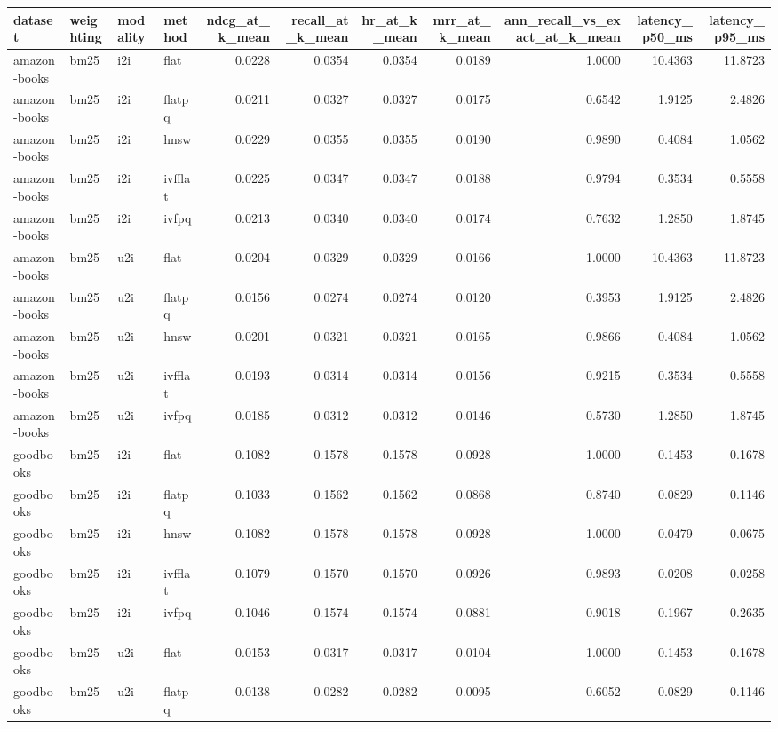 \begin{tabular}{llllrrrrrrr}
\toprule
dataset & weighting & modality & method & ndcg_at_k_mean & recall_at_k_mean & hr_at_k_mean & mrr_at_k_mean & ann_recall_vs_exact_at_k_mean & latency_p50_ms & latency_p95_ms \\
\midrule
amazon-books & bm25 & i2i & flat & 0.0228 & 0.0354 & 0.0354 & 0.0189 & 1.0000 & 10.4363 & 11.8723 \\
amazon-books & bm25 & i2i & flatpq & 0.0211 & 0.0327 & 0.0327 & 0.0175 & 0.6542 & 1.9125 & 2.4826 \\
amazon-books & bm25 & i2i & hnsw & 0.0229 & 0.0355 & 0.0355 & 0.0190 & 0.9890 & 0.4084 & 1.0562 \\
amazon-books & bm25 & i2i & ivfflat & 0.0225 & 0.0347 & 0.0347 & 0.0188 & 0.9794 & 0.3534 & 0.5558 \\
amazon-books & bm25 & i2i & ivfpq & 0.0213 & 0.0340 & 0.0340 & 0.0174 & 0.7632 & 1.2850 & 1.8745 \\
amazon-books & bm25 & u2i & flat & 0.0204 & 0.0329 & 0.0329 & 0.0166 & 1.0000 & 10.4363 & 11.8723 \\
amazon-books & bm25 & u2i & flatpq & 0.0156 & 0.0274 & 0.0274 & 0.0120 & 0.3953 & 1.9125 & 2.4826 \\
amazon-books & bm25 & u2i & hnsw & 0.0201 & 0.0321 & 0.0321 & 0.0165 & 0.9866 & 0.4084 & 1.0562 \\
amazon-books & bm25 & u2i & ivfflat & 0.0193 & 0.0314 & 0.0314 & 0.0156 & 0.9215 & 0.3534 & 0.5558 \\
amazon-books & bm25 & u2i & ivfpq & 0.0185 & 0.0312 & 0.0312 & 0.0146 & 0.5730 & 1.2850 & 1.8745 \\
goodbooks & bm25 & i2i & flat & 0.1082 & 0.1578 & 0.1578 & 0.0928 & 1.0000 & 0.1453 & 0.1678 \\
goodbooks & bm25 & i2i & flatpq & 0.1033 & 0.1562 & 0.1562 & 0.0868 & 0.8740 & 0.0829 & 0.1146 \\
goodbooks & bm25 & i2i & hnsw & 0.1082 & 0.1578 & 0.1578 & 0.0928 & 1.0000 & 0.0479 & 0.0675 \\
goodbooks & bm25 & i2i & ivfflat & 0.1079 & 0.1570 & 0.1570 & 0.0926 & 0.9893 & 0.0208 & 0.0258 \\
goodbooks & bm25 & i2i & ivfpq & 0.1046 & 0.1574 & 0.1574 & 0.0881 & 0.9018 & 0.1967 & 0.2635 \\
goodbooks & bm25 & u2i & flat & 0.0153 & 0.0317 & 0.0317 & 0.0104 & 1.0000 & 0.1453 & 0.1678 \\
goodbooks & bm25 & u2i & flatpq & 0.0138 & 0.0282 & 0.0282 & 0.0095 & 0.6052 & 0.0829 & 0.1146 \\

\end{tabular}
